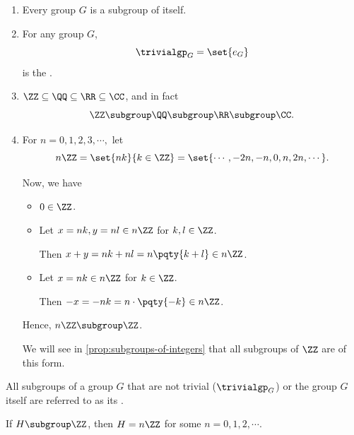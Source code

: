 \begin{examples*}
    \begin{enumerate}
        \item Every group \(G\) is a subgroup of itself.

        \item For any group \(G\),
        \[
            \trivialgp_G = \set{e_G}
        \]
        is the .

        \item \(\ZZ \subseteq \QQ \subseteq \RR \subseteq \CC\), and in fact
        \[
            \ZZ \subgroup \QQ \subgroup \RR \subgroup \CC.
        \]

        \item For \(n = 0, 1, 2, 3, \cdots,\) let
        \[
            n\ZZ = \set{nk}{k \in \ZZ} = \set{\cdots, -2n, -n, 0, n, 2n, \cdots}.
        \]

        Now, we have
        \begin{itemize}
            \item \(0 \in \ZZ\).
            \item Let \(x = nk, y = nl \in n\ZZ\) for \(k, l \in \ZZ\).
            
            Then \(x + y = nk + nl = n \pqty{k + l} \in n\ZZ\).
            \item Let \(x = nk \in n\ZZ\) for \(k \in \ZZ\).
            
            Then \(-x = -nk = n \cdot \pqty{-k} \in n\ZZ\).
        \end{itemize}

        Hence, \(n\ZZ \subgroup \ZZ\).

        We will see in \autoref{prop:subgroups-of-integers} that all subgroups of \(\ZZ\) are of this form.
    \end{enumerate}
\end{examples*}

\begin{remark}
    All subgroups of a group \(G\) that are not trivial (\(\trivialgp_G\)) or the group \(G\) itself are referred to as its .
\end{remark}

\begin{proposition}
    \label{prop:subgroups-of-integers}%
    If \(H \subgroup \ZZ\), then \(H = n\ZZ\) for some \(n = 0, 1, 2, \cdots\).
\end{proposition}

